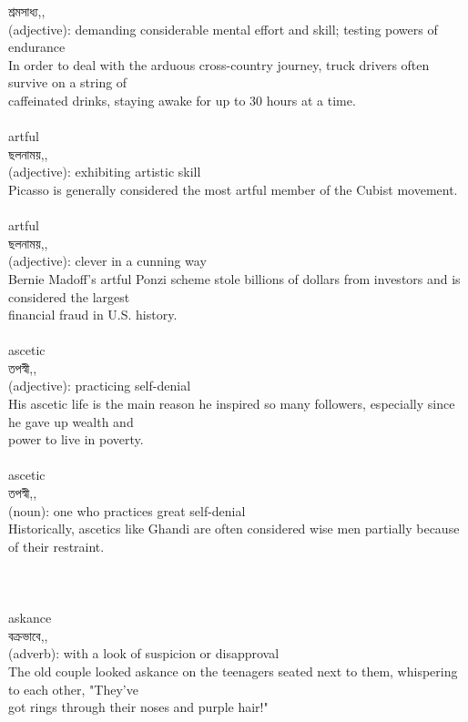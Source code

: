 \documentclass{article}
\begin{document}
{শ্রমসাধ্য,,}\\
{(adjective): demanding considerable mental effort and skill; testing powers of endurance\\In order to deal with the arduous cross-country journey, truck drivers often survive on a string of\\caffeinated drinks, staying awake for up to 30 hours at a time.\\}\\
{artful}\\
{ছলনাময়,,}\\
{(adjective): exhibiting artistic skill\\Picasso is generally considered the most artful member of the Cubist movement.\\}\\
{artful}\\
{ছলনাময়,,}\\
{(adjective): clever in a cunning way\\Bernie Madoff's artful Ponzi scheme stole billions of dollars from investors and is considered the largest\\financial fraud in U.S. history.\\}\\
{ascetic}\\
{তপস্বী,,}\\
{(adjective): practicing self-denial\\His ascetic life is the main reason he inspired so many followers, especially since he gave up wealth and\\power to live in poverty.\\}\\
{ascetic}\\
{তপস্বী,,}\\
{(noun): one who practices great self-denial\\Historically, ascetics like Ghandi are often considered wise men partially because of their restraint.\\\\                                                                                   \\}\\
{askance}\\
{বক্রভাবে,,}\\
{(adverb): with a look of suspicion or disapproval\\The old couple looked askance on the teenagers seated next to them, whispering to each other, "They've\\got rings through their noses and purple hair!"\\}\\
\end{document}

